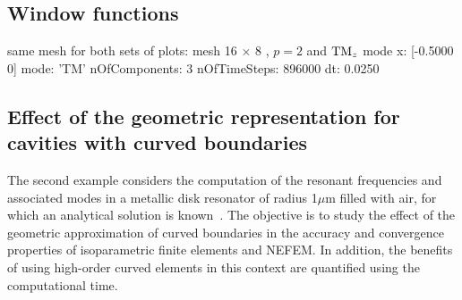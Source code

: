 \subsection{Window functions}
same mesh for both sets of plots:
mesh 16 $\times$ 8 , $p = 2$ and $\textrm{TM}_{z}$ mode
                x: [-0.5000 0]
             mode: 'TM'
    nOfComponents: 3
     nOfTimeSteps: 896000
               dt: 0.0250
\begin{figure}[!ht]
	\centering
{} 
\end{figure}
\begin{figure}[!ht]
	\centering
{}
\end{figure}
\begin{figure}[!ht]
	\centering
	\label{fig:rectangle2DfreeSpace_filteringConvergence}
\end{figure}
\clearpage
\subsection{Effect of the geometric representation for cavities with curved boundaries}
The second example considers the computation of the resonant frequencies and associated modes in a metallic disk resonator of radius 1$\mu$m filled with air, for which an analytical solution is known~\cite{BalanisBook}. The objective is to study the effect of the geometric approximation of curved boundaries in the accuracy and convergence properties of isoparametric finite elements and NEFEM. In addition, the benefits of using high-order curved elements in this context are quantified using the computational time. 

